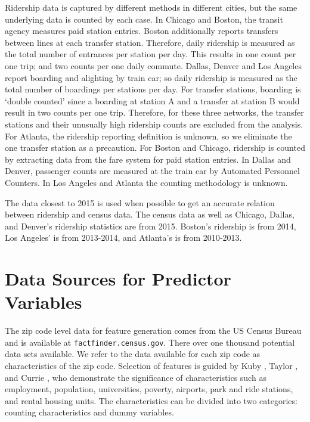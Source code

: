 \documentclass[11pt]{report}
\begin{document}
Ridership data is captured by different methods in different cities, but the same underlying data is counted by each case. In Chicago and Boston, the transit agency measures paid station entries. Boston additionally reports transfers between lines at each transfer station. Therefore, daily ridership is measured as the total number of entrances per station per day. This results in one count per one trip; and two counts per one daily commute. Dallas, Denver and Los Angeles report boarding and alighting by train car; so daily ridership is measured as the total number of boardings per stations per day. For transfer stations, boarding is `double counted' since a boarding at station A and a transfer at station B would result in two counts per one trip. Therefore, for these three networks, the transfer stations and their unusually high ridership counts are excluded from the analysis. For Atlanta, the ridership reporting definition is unknown, so we eliminate the one transfer station as a precaution. For Boston and Chicago, ridership is counted by extracting data from the fare system for paid station entries. In Dallas and Denver, passenger counts are measured at the train car by Automated Personnel Counters. In Los Angeles and Atlanta the counting methodology is unknown. 

The data closest to 2015 is used when possible to get an accurate relation between ridership and census data. The census data as well as Chicago, Dallas, and Denver's ridership statistics are from 2015. Boston's ridership is from 2014, Los Angeles' is from 2013-2014, and Atlanta's is from 2010-2013. 

\section{Data Sources for Predictor Variables}\label{sec:data}

The zip code level data for feature generation comes from the US Census Bureau and is available at \texttt{factfinder.census.gov}. There over one thousand potential data sets available. We refer to the data available for each zip code as characteristics of the zip code. Selection of features is guided by Kuby \cite{Kuby2004}, Taylor \cite{Taylor2008}, and Currie \cite{Currie2011}, who demonstrate the significance of characteristics such as employment, population, universities, poverty, airports, park and ride stations, and rental housing units. The characteristics can be divided into two categories: counting characteristics and dummy variables. 
\end{document}
